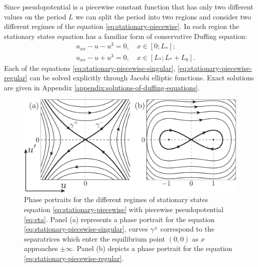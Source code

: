 Since pseudopotential is a piecewise constant function that has only two different values on the period $L$ we can split the period into two regions and consider two different regimes of the equation \eqref{eq:stationary-piecewise}.
In each region the stationary states equation has a familiar form of conservative Duffing equation:
\begin{eqnarray}
	&& u_{xx} - u - u^3 = 0, \quad x \in [0; L_*];\label{eq:stationary-piecewise-singular} \\
	&& u_{xx} - u + u^3 = 0, \quad x \in [L_*; L_* + L_0] \label{eq:stationary-piecewise-regular}.
\end{eqnarray}
Each of the equations \eqref{eq:stationary-piecewise-singular}, \eqref{eq:stationary-piecewise-regular} can be solved explicitly  through Jacobi elliptic functions.
Exact solutions are given in Appendix \ref{appendix:solutions-of-duffing-equations}.
\begin{figure}[h]
\centering
	\includegraphics[scale = 1]{pic/phase portraits}
	\caption{Phase portraits for the different regimes of stationary states equation \eqref{eq:stationary-piecewise} with piecewise pseudopotential \eqref{eq:eta}. Panel (a) represents a phase portrait for the equation \eqref{eq:stationary-piecewise-singular}, curves $\gamma^{\pm}$ correspond to the separatrices which enter the equilibrium point $(0, 0)$ as $x$ approaches $\pm \infty$. Panel (b) depicts a phase portrait for the equation \eqref{eq:stationary-piecewise-regular}.}
\label{fig:phase-portraits}
\end{figure}

